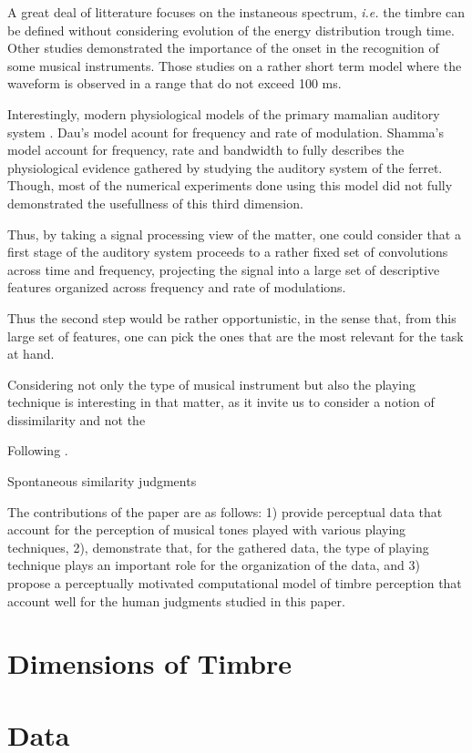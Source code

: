 \documentclass{article}
\begin{document}
A great deal of litterature focuses on the instaneous spectrum, \textit{i.e.} the timbre can be defined without considering evolution of the energy distribution trough time. Other studies demonstrated the importance of the onset in the recognition of some musical instruments. Those studies on a rather short term model where the waveform is observed in a range that do not exceed 100 ms.

Interestingly, modern physiological models of the primary mamalian auditory system  .  Dau's model acount for frequency and rate of modulation. Shamma's model account for frequency, rate and bandwidth to fully describes the physiological evidence gathered by studying the auditory system of the ferret. Though, most of the numerical experiments done using this model did not fully demonstrated the usefullness of this third dimension.

Thus, by taking a signal processing view of the matter, one could consider that a first stage of the auditory system proceeds to a rather fixed set of convolutions across time and frequency, projecting the signal into a large set of descriptive features organized across frequency and rate of modulations.


Thus the second step would be rather opportunistic, in the sense that, from this large set of features, one can pick the ones that are the most relevant for the task at hand.

Considering not only the type of musical instrument but also the playing technique is interesting in that matter, as it invite us to consider a notion of dissimilarity and not the


Following .

Spontaneous similarity judgments

The contributions of the paper are as follows: 1) provide perceptual data that account for the perception of musical tones played with various playing techniques, 2), demonstrate that, for the gathered data, the type of playing technique plays an important role for the organization of the data, and 3) propose a perceptually motivated computational model of timbre perception that account well for the human judgments studied in this paper.

\section{Dimensions of Timbre}\label{sec:}

\section{Data}\label{sec:}
\end{document}
